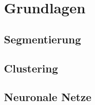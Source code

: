 \chapter{Grundlagen}
\label{chap:grundlagen}

\section{Segmentierung}
\label{sec:segmentierung}

\section{Clustering}
\label{sec:clustering}

\section{Neuronale Netze}
\label{sec:nn}